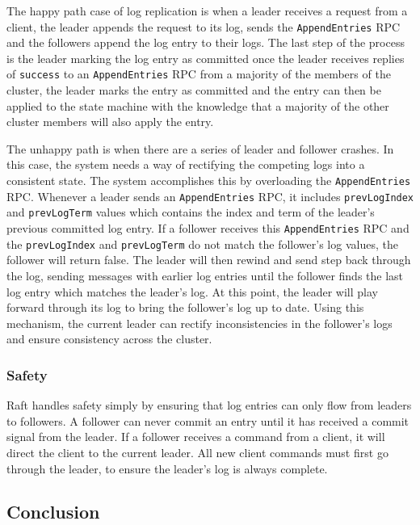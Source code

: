 The happy path case of log replication is when a leader receives a request from a client, the leader appends the request to its log, sends the \texttt{AppendEntries} RPC and the followers append the log entry to their logs.
The last step of the process is the leader marking the log entry as committed once the leader receives replies of \texttt{success} to an \texttt{AppendEntries} RPC from a majority of the members of the cluster, the leader marks the entry as committed and the entry can then be applied to the state machine with the knowledge that a majority of the other cluster members will also apply the entry.

The unhappy path is when there are a series of leader and follower crashes.
In this case, the system needs a way of rectifying the competing logs into a consistent state.
The system accomplishes this by overloading the \texttt{AppendEntries} RPC.
Whenever a leader sends an \texttt{AppendEntries} RPC, it includes \texttt{prevLogIndex} and \texttt{prevLogTerm} values which contains the index and term of the leader's previous committed log entry.
If a follower receives this \texttt{AppendEntries} RPC and the \texttt{prevLogIndex} and \texttt{prevLogTerm} do not match the follower's log values, the follower will return false.
The leader will then rewind and send step back through the log, sending messages with earlier log entries until the follower finds the last log entry which matches the leader's log.  At this point, the leader will play forward through its log to bring the follower's log up to date.
Using this mechanism, the current leader can rectify inconsistencies in the follower's logs and ensure consistency across the cluster.


\subsubsection{Safety}

Raft handles safety simply by ensuring that log entries can only flow from leaders to followers.
A follower can never commit an entry until it has received a commit signal from the leader.  If a follower receives a command from a client, it will direct the client to the current leader.  All new client commands must first go through the leader, to ensure the leader's log is always complete.




\subsection{Conclusion}

